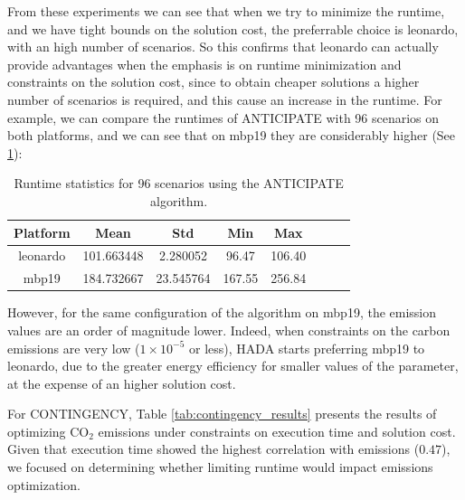 \documentclass[a4paper,singleside,12pt]{report} %
\begin{document}
From these experiments we can see that when we try to minimize the runtime, and we have tight bounds on the solution cost, the preferrable choice is leonardo, with an high number of scenarios. 
So this confirms that leonardo can actually provide advantages when the emphasis is on runtime minimization and constraints on the solution cost, since to obtain cheaper solutions a higher number
of scenarios is required, and this cause an increase in the runtime. For example, we can compare the runtimes of ANTICIPATE with 96 scenarios on both platforms, and we can see that on mbp19 they
are considerably higher (See \ref{tab:96_scenarios_runtime}):

\begin{table}[h]
    \centering
    \begin{tabular}{cccccccc}
        \hline
        \textbf{Platform} & \textbf{Mean} & \textbf{Std} & \textbf{Min} & \textbf{Max} \\
        \hline
        leonardo & 101.663448 & 2.280052 & 96.47 & 106.40 \\
        mbp19    & 184.732667 & 23.545764 & 167.55 & 256.84 \\
        \hline
    \end{tabular}
    \caption{Runtime statistics for 96 scenarios using the ANTICIPATE algorithm.}
    \label{tab:96_scenarios_runtime}
\end{table}

However, for the same configuration of the algorithm on mbp19, the emission values are an order of magnitude lower. Indeed, when constraints on the carbon emissions are very 
low ($ 1 \times 10 ^ {-5}$ or less), HADA starts preferring mbp19 to leonardo, due to the greater energy efficiency for smaller values of the parameter,
at the expense of an higher solution cost.

For CONTINGENCY, Table \ref{tab:contingency_results} presents the results of optimizing CO$_2$ emissions under constraints on execution time and solution cost. Given that execution time 
showed the highest correlation with emissions ($0.47$), we focused on determining whether limiting runtime would impact emissions optimization.
\end{document}

